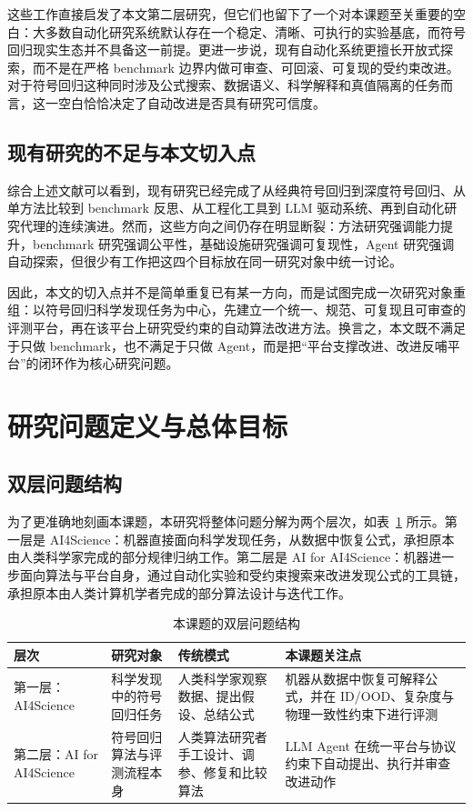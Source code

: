 \documentclass[UTF8,12pt]{ctexart}
\begin{document}
这些工作直接启发了本文第二层研究，但它们也留下了一个对本课题至关重要的空白：大多数自动化研究系统默认存在一个稳定、清晰、可执行的实验基底，而符号回归现实生态并不具备这一前提。更进一步说，现有自动化系统更擅长开放式探索，而不是在严格 benchmark 边界内做可审查、可回滚、可复现的受约束改进。对于符号回归这种同时涉及公式搜索、数据语义、科学解释和真值隔离的任务而言，这一空白恰恰决定了自动改进是否具有研究可信度。

\subsection{现有研究的不足与本文切入点}

综合上述文献可以看到，现有研究已经完成了从经典符号回归到深度符号回归、从单方法比较到 benchmark 反思、从工程化工具到 LLM 驱动系统、再到自动化研究代理的连续演进。然而，这些方向之间仍存在明显断裂：方法研究强调能力提升，benchmark 研究强调公平性，基础设施研究强调可复现性，Agent 研究强调自动探索，但很少有工作把这四个目标放在同一研究对象中统一讨论。

因此，本文的切入点并不是简单重复已有某一方向，而是试图完成一次研究对象重组：以符号回归科学发现任务为中心，先建立一个统一、规范、可复现且可审查的评测平台，再在该平台上研究受约束的自动算法改进方法。换言之，本文既不满足于只做 benchmark，也不满足于只做 Agent，而是把“平台支撑改进、改进反哺平台”的闭环作为核心研究问题。

\section{研究问题定义与总体目标}

\subsection{双层问题结构}

为了更准确地刻画本课题，本研究将整体问题分解为两个层次，如表~\ref{tab:two-layer-problem} 所示。第一层是 AI4Science：机器直接面向科学发现任务，从数据中恢复公式，承担原本由人类科学家完成的部分规律归纳工作。第二层是 AI for AI4Science：机器进一步面向算法与平台自身，通过自动化实验和受约束搜索来改进发现公式的工具链，承担原本由人类计算机学者完成的部分算法设计与迭代工作。

\begin{table}[H]
\centering
\begin{tabular}{p{2.6cm}p{3.0cm}p{3.7cm}p{4.6cm}}
\toprule
层次 & 研究对象 & 传统模式 & 本课题关注点 \\
\midrule
第一层：AI4Science & 科学发现中的符号回归任务 & 人类科学家观察数据、提出假设、总结公式 & 机器从数据中恢复可解释公式，并在 ID/OOD、复杂度与物理一致性约束下进行评测 \\
第二层：AI for AI4Science & 符号回归算法与评测流程本身 & 人类算法研究者手工设计、调参、修复和比较算法 & LLM Agent 在统一平台与协议约束下自动提出、执行并审查改进动作 \\
\bottomrule
\end{tabular}
\caption{本课题的双层问题结构}
\label{tab:two-layer-problem}
\end{table}
\end{document}
